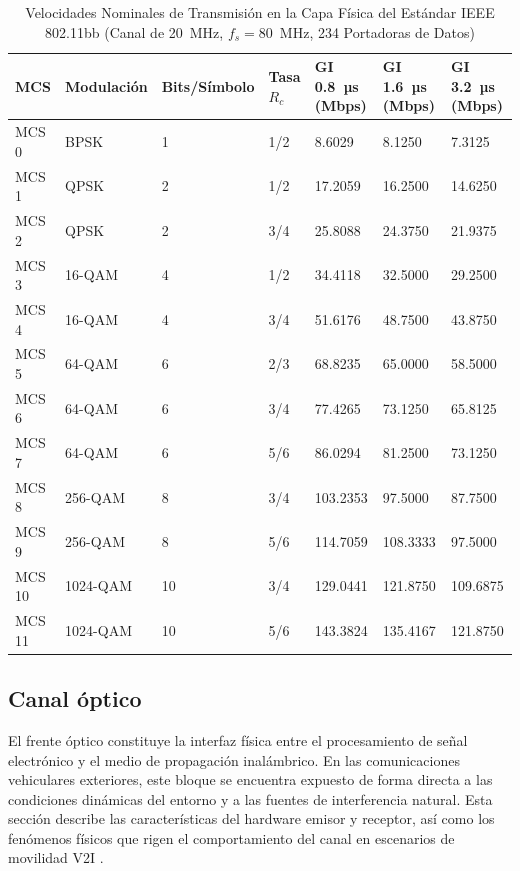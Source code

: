 \begin{table}[htbp]
	\centering
	\caption{Velocidades Nominales de Transmisión en la Capa Física del Estándar IEEE 802.11bb (Canal de 20~MHz, $f_s = 80$~MHz, 234 Portadoras de Datos)}
	\label{tab:mcs_velocidades_bb}
	\begin{tabular}{|p{1.5cm}|p{2.2cm}|p{1.8cm}|p{1.5cm}|p{2.2cm}|p{2.2cm}|p{2.2cm}|}
		\hline
		\textbf{MCS} & \textbf{Modulación} & \textbf{Bits/Símbolo} & \textbf{Tasa $R_c$} & \textbf{GI 0.8~µs (Mbps)} & \textbf{GI 1.6~µs (Mbps)} & \textbf{GI 3.2~µs (Mbps)} \\ \hline
		MCS 0 & BPSK & 1 & 1/2 & 8.6029 & 8.1250 & 7.3125 \\ \hline
		MCS 1 & QPSK & 2 & 1/2 & 17.2059 & 16.2500 & 14.6250 \\ \hline
		MCS 2 & QPSK & 2 & 3/4 & 25.8088 & 24.3750 & 21.9375 \\ \hline
		MCS 3 & 16-QAM & 4 & 1/2 & 34.4118 & 32.5000 & 29.2500 \\ \hline
		MCS 4 & 16-QAM & 4 & 3/4 & 51.6176 & 48.7500 & 43.8750 \\ \hline
		MCS 5 & 64-QAM & 6 & 2/3 & 68.8235 & 65.0000 & 58.5000 \\ \hline
		MCS 6 & 64-QAM & 6 & 3/4 & 77.4265 & 73.1250 & 65.8125 \\ \hline
		MCS 7 & 64-QAM & 6 & 5/6 & 86.0294 & 81.2500 & 73.1250 \\ \hline
		MCS 8 & 256-QAM & 8 & 3/4 & 103.2353 & 97.5000 & 87.7500 \\ \hline
		MCS 9 & 256-QAM & 8 & 5/6 & 114.7059 & 108.3333 & 97.5000 \\ \hline
		MCS 10 & 1024-QAM & 10 & 3/4 & 129.0441 & 121.8750 & 109.6875 \\ \hline
		MCS 11 & 1024-QAM & 10 & 5/6 & 143.3824 & 135.4167 & 121.8750 \\ \hline
	\end{tabular}
\end{table}

\subsection{Canal óptico}
El frente óptico constituye la interfaz física entre el procesamiento de señal electrónico y el medio de propagación inalámbrico. En las comunicaciones vehiculares exteriores, este bloque se encuentra expuesto de forma directa a las condiciones dinámicas del entorno y a las fuentes de interferencia natural. Esta sección describe las características del hardware emisor y receptor, así como los fenómenos físicos que rigen el comportamiento del canal en escenarios de movilidad V2I \cite{feukeu2023enhancing}.

